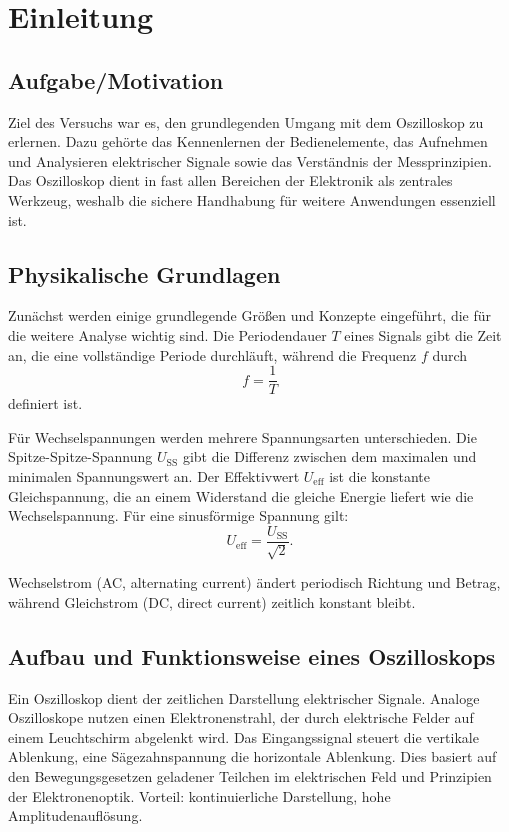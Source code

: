 \chapter{Einleitung}

\section{Aufgabe/Motivation}
Ziel des Versuchs war es, den grundlegenden Umgang mit dem Oszilloskop zu erlernen. Dazu gehörte das Kennenlernen der Bedienelemente, das Aufnehmen und Analysieren elektrischer Signale sowie das Verständnis der Messprinzipien. Das Oszilloskop dient in fast allen Bereichen der Elektronik als zentrales Werkzeug, weshalb die sichere Handhabung für weitere Anwendungen essenziell ist.

\section{Physikalische Grundlagen}
\cite{skript25}
Zunächst werden einige grundlegende Größen und Konzepte eingeführt, die für die weitere Analyse wichtig sind. Die Periodendauer $T$ eines Signals gibt die Zeit an, die eine vollständige Periode durchläuft, während die Frequenz $f$ durch
\begin{equation}
f = \frac{1}{T}
\label{eq:freq}
\end{equation}
definiert ist.  

Für Wechselspannungen werden mehrere Spannungsarten unterschieden. Die Spitze-Spitze-Spannung $U_\text{SS}$ gibt die Differenz zwischen dem maximalen und minimalen Spannungswert an. Der Effektivwert $U_\text{eff}$ ist die konstante Gleichspannung, die an einem Widerstand die gleiche Energie liefert wie die Wechselspannung. Für eine sinusförmige Spannung gilt:
\begin{equation}
U_\text{eff} = \frac{U_\text{SS}}{\sqrt{2}}.
\end{equation}

Wechselstrom (AC, alternating current) ändert periodisch Richtung und Betrag, während Gleichstrom (DC, direct current) zeitlich konstant bleibt.  

\section{Aufbau und Funktionsweise eines Oszilloskops}
Ein Oszilloskop dient der zeitlichen Darstellung elektrischer Signale. Analoge Oszilloskope nutzen einen Elektronenstrahl, der durch elektrische Felder auf einem Leuchtschirm abgelenkt wird. Das Eingangssignal steuert die vertikale Ablenkung, eine Sägezahnspannung die horizontale Ablenkung. Dies basiert auf den Bewegungsgesetzen geladener Teilchen im elektrischen Feld und Prinzipien der Elektronenoptik. Vorteil: kontinuierliche Darstellung, hohe Amplitudenauflösung.

